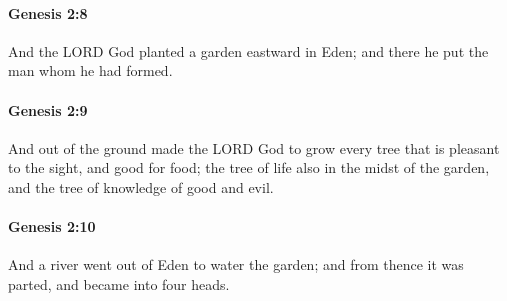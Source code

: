 		\paragraph{Genesis 2:8} %
			\label{GENESIS-2-8}
			
			And the LORD God planted a garden eastward in Eden;	and there he put the man whom he had formed.


		\paragraph{Genesis 2:9} %
			\label{GENESIS-2-9}

			And out of the ground made the LORD God to grow every tree that is pleasant to the sight, and good for food; the tree of life also in the midst of the garden, and the tree of knowledge of good and evil.


		\paragraph{Genesis 2:10} %
			\label{GENESIS-2-10}

			And a river went out of Eden to water the garden; and from thence it was parted, and became into four heads.


